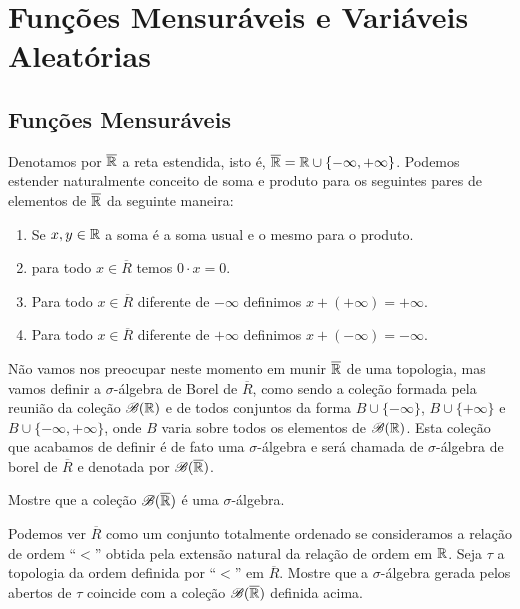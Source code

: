 \chapter[Aula 5]{Funções Mensuráveis e Variáveis Aleatórias}
\chaptermark{}

\section{Funções Mensuráveis}

Denotamos por $\overline{\mathbb{R}}$ a reta estendida, isto é, 
$\overline{\mathbb{R}} = \mathbb{R}\cup\{-\infty,+\infty\}$. Podemos 
estender naturalmente conceito de soma e produto 
para os seguintes pares de elementos 
de $\overline{\mathbb{R}}$ da seguinte maneira:
\begin{enumerate}
	\item 
	Se $x,y\in \mathbb{R}$ a soma é a soma usual 
	e o mesmo para o produto. 
	
	\item para todo $x\in \overline{R}$ temos 
	$0\cdot x=0$.
	
	\item Para todo $x\in \overline{R}$ diferente de 
	$-\infty$ definimos $x+(+\infty)=+\infty$.

	\item Para todo $x\in \overline{R}$ diferente de 
	$+\infty$ definimos $x+(-\infty)=-\infty$.
\end{enumerate}

Não vamos nos preocupar neste momento em munir $\overline{\mathbb{R}}$ 
de uma topologia, mas vamos definir a $\sigma$-álgebra
de Borel de $\overline{R}$,
como sendo a coleção formada pela reunião da
coleção $\mathscr{B}(\mathbb{R})$ 
e de todos conjuntos da forma 
$B\cup\{-\infty\}$, $B\cup\{+\infty\}$ e $B\cup\{-\infty,+\infty\}$,
onde $B$ varia sobre todos os elementos de $\mathscr{B}(\mathbb{R})$.
Esta coleção que acabamos de definir
é de fato uma $\sigma$-álgebra e será chamada de $\sigma$-álgebra
de borel de $\overline{R}$ e denotada por $\mathscr{B}(\overline{\mathbb{R}})$.

\begin{exercicio}
	Mostre que a coleção $\mathscr{B}(\overline{\mathbb{R}})$ 
	é uma $\sigma$-álgebra.
\end{exercicio}

\begin{exercicio}
	Podemos ver $\overline{R}$ como um conjunto totalmente ordenado se 
	consideramos a relação de ordem ``$<$'' obtida pela extensão natural 
	da relação de ordem em $\mathbb{R}$.
	Seja $\tau$ a topologia da ordem definida por ``$<$'' 
	em $\overline{R}$. Mostre que a $\sigma$-álgebra gerada pelos 
	abertos de $\tau$ coincide com a coleção $\mathscr{B}(\overline{\mathbb{R}})$
	definida acima. 
	
\end{exercicio}










